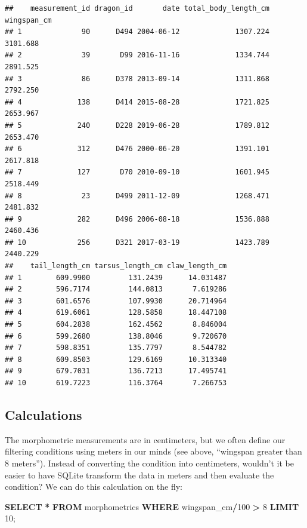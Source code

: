 \documentclass[
]{book}
\newenvironment{Shaded}{\begin{snugshade}}{\end{snugshade}}
\newcommand{\DecValTok}[1]{\textcolor[rgb]{0.00,0.00,0.81}{#1}}
\newcommand{\KeywordTok}[1]{\textcolor[rgb]{0.13,0.29,0.53}{\textbf{#1}}}
\newcommand{\NormalTok}[1]{#1}
\newcommand{\OperatorTok}[1]{\textcolor[rgb]{0.81,0.36,0.00}{\textbf{#1}}}
\begin{document}
\begin{verbatim}
##    measurement_id dragon_id       date total_body_length_cm wingspan_cm
## 1              90      D494 2004-06-12             1307.224    3101.688
## 2              39       D99 2016-11-16             1334.744    2891.525
## 3              86      D378 2013-09-14             1311.868    2792.250
## 4             138      D414 2015-08-28             1721.825    2653.967
## 5             240      D228 2019-06-28             1789.812    2653.470
## 6             312      D476 2000-06-20             1391.101    2617.818
## 7             127       D70 2010-09-10             1601.945    2518.449
## 8              23      D499 2011-12-09             1268.471    2481.832
## 9             282      D496 2006-08-18             1536.888    2460.436
## 10            256      D321 2017-03-19             1423.789    2440.229
##    tail_length_cm tarsus_length_cm claw_length_cm
## 1        609.9900         131.2439      14.031487
## 2        596.7174         144.0813       7.619286
## 3        601.6576         107.9930      20.714964
## 4        619.6061         128.5858      18.447108
## 5        604.2838         162.4562       8.846004
## 6        599.2680         138.8046       9.720670
## 7        598.8351         135.7797       8.544782
## 8        609.8503         129.6169      10.313340
## 9        679.7031         136.7213      17.495741
## 10       619.7223         116.3764       7.266753
\end{verbatim}

\hypertarget{calculations}{%
\subsection{Calculations}\label{calculations}}

The morphometric measurements are in centimeters, but we often define our
filtering conditions using meters in our minds (see above, ``wingspan greater
than 8 meters''). Instead of converting the condition into centimeters, wouldn't
it be easier to have SQLite transform the data in meters and then evaluate the
condition? We can do this calculation on the fly:

\begin{Shaded}
\begin{Highlighting}[]
\KeywordTok{SELECT} \OperatorTok{*} 
\KeywordTok{FROM}\NormalTok{ morphometrics}
\KeywordTok{WHERE}\NormalTok{ wingspan\_cm}\OperatorTok{/}\DecValTok{100} \OperatorTok{\textgreater{}} \DecValTok{8}
\KeywordTok{LIMIT} \DecValTok{10}\NormalTok{;}
\end{Highlighting}
\end{Shaded}
\end{document}
